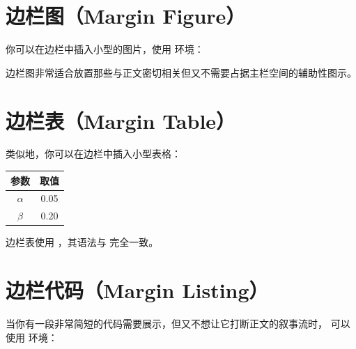 \section{边栏图（Margin Figure）}

你可以在边栏中插入小型的图片，使用  环境：

\begin{marginfigure}
    \centering
    \caption[边栏图示例]{边栏图示例。在真实使用中，此处应放置一幅小型插图。
    边栏图的标题位于图片下方，格式与边栏注释一致。}
\end{marginfigure}

边栏图非常适合放置那些与正文密切相关但又不需要占据主栏空间的辅助性图示。

\section{边栏表（Margin Table）}

类似地，你可以在边栏中插入小型表格：

\begin{margintable}
    \caption[边栏表示例]{边栏表示例。边栏表的标题默认位于表格上方。}
    \begin{tabular}{c c}
        \toprule
        参数 & 取值 \\
        \midrule
        $\alpha$ & 0.05 \\
        $\beta$  & 0.20 \\
        \bottomrule
    \end{tabular}
\end{margintable}


边栏表使用 ，其语法与  完全一致。

\section{边栏代码（Margin Listing）}

当你有一段非常简短的代码需要展示，但又不想让它打断正文的叙事流时，
可以使用  环境：

